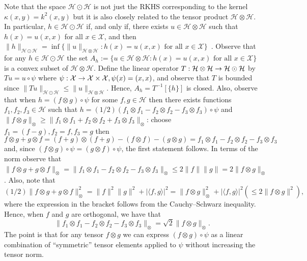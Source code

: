 \documentclass[AHL,Unicode,longabstracts,published]{cedram}
\theoremstyle{remark}
\newcommand{\X}{\mathcal{X}}
\newcommand{\cH}{\mathcal{H}}
\renewcommand*{\to}{\mathchoice{\longrightarrow}{\rightarrow}{\rightarrow}{\rightarrow}}
\begin{document}
Note that the space $\cH \odot \cH$ is not just the RKHS corresponding to the kernel $\kappa(x,y) = k^2(x,y)$ but it is also closely related to the tensor product $\cH \otimes \cH$. In particular, $ h \in \cH \odot \cH$ if, and only if, there exists $u\in \cH \otimes \cH$ such that $h(x) = u(x,x)$ for all $x \in \X$, and then $\|h\|_{\cH \odot \cH} = \inf\{\|u\|_{\cH \otimes \cH} : h(x) = u(x,x) \text{ for all } x\in \X \}$~\cite[Theorem~5.16]{PAUL16}. Observe that for any $h \in \cH \odot \cH$ the set $A_h:= \{u \in \cH \otimes \cH : h(x) = u(x,x) \text{ for all } x\in \X \}$ is a convex subset of $\cH \otimes \cH$. Define the linear operator $T: \cH \otimes \cH \to \cH \odot \cH$ by $T u = u \circ \psi$ where $\psi: \X \to \X \times \X, \psi(x) = (x,x)$, and observe that $T$ is bounded since $\|Tu\|_{\cH \odot \cH} \leq \|u\|_{\cH \otimes \cH}$. Hence, $A_h = T^{-1}[\{h\}]$ is closed. Also, observe that when $h = (f\otimes g) \circ \psi$ for some $f,g \in \cH$ then there exists functions $f_1,f_2,f_3 \in \cH$ such that $h = (1/2) (f_1 \otimes f_1 - f_2 \otimes f_2 - f_3 \otimes f_3) \circ \psi$ and $\|f \otimes g\|_\otimes \geq \|f_1 \otimes f_1 + f_2 \otimes f_2 + f_3 \otimes f_3 \|_\otimes$: choose $f_1 = (f- g), f_2 = f, f_3 = g$ then
\[
f \otimes g + g \otimes f = (f+g) \otimes (f+g) - (f \otimes f) - (g \otimes g) = f_1 \otimes f_1 - f_2 \otimes f_2 - f_3 \otimes f_3
\]
and, since $(f \otimes g) \circ \psi = (g \otimes f) \circ \psi$, the first statement follows. In terms of the norm observe that $\| f \otimes g + g\otimes f\|_\otimes = \| f_1 \otimes f_1 - f_2 \otimes f_2 - f_3 \otimes f_3\|_\otimes \leq 2\|f\|\|g\| = 2 \|f\otimes g\|_\otimes$. Also, note that
\[
(1/2)\| f \otimes g + g \otimes f\|_\otimes^2 = \|f\|^2 \|g\|^2 + |\langle f, g \rangle|^2 = \|f \otimes g\|_\otimes^2 + |\langle f, g \rangle|^2 (\leq 2 \|f \otimes g\|^2),
\]
where the expression in the bracket follows from the Cauchy--Schwarz inequality. Hence, when $f$ and $g$ are orthogonal, we have that
\[
\| f_1 \otimes f_1 - f_2 \otimes f_2 - f_3 \otimes f_3\|_\otimes = \sqrt{2} \|f \otimes g\|_\otimes.
\]
The point is that for any tensor $f \otimes g$ we can express $(f \otimes g) \circ \psi$ as a linear combination of ``symmetric'' tensor elements applied to $\psi$ without increasing the tensor norm.
\end{document}
